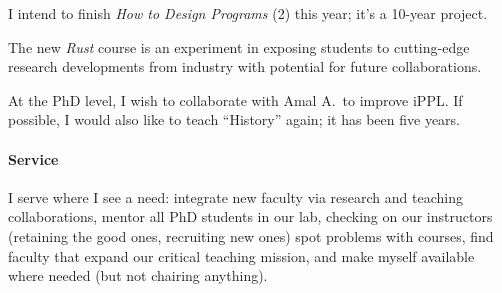 \documentclass{article}
\begin{document}
I intend to finish {\it How to Design Programs} (2) this year; it's a 10-year
 project. 

The new {\em Rust\/} course is an experiment in exposing students to
 cutting-edge research developments from industry with potential for future
 collaborations. 

At the PhD level, I wish to collaborate with Amal A.\ to improve iPPL. If
 possible, I would also like to teach ``History'' again; it has been five
 years.

\paragraph{Service} I serve where I see a need: integrate new faculty via
 research and teaching collaborations, mentor all PhD students in our lab,
 checking on our instructors (retaining the good ones, recruiting new ones)
 spot problems with courses, find faculty that expand our critical teaching
 mission, and make myself available where needed (but not chairing anything).
\end{document}
